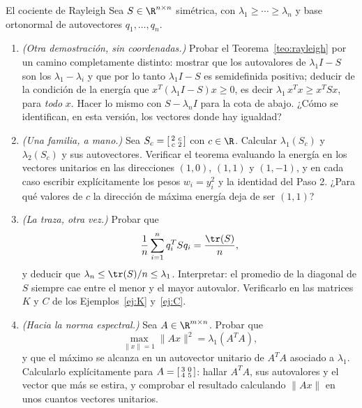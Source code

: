 \begin{entrega}{El cociente de Rayleigh}\label{ent:rayleigh}
Sea $S\in\R^{n\times n}$ simétrica, con $\lambda_1\ge\cdots\ge\lambda_n$ y
base ortonormal de autovectores $q_1,\dots,q_n$.

\begin{enumerate}[label=\textbf{(\alph*)},itemsep=3pt,topsep=4pt]
\item\label{item:rayleigh} \emph{(Otra demostración, sin coordenadas.)} Probar
el Teorema~\ref{teo:rayleigh} por un camino completamente distinto: mostrar
que los autovalores de $\lambda_1I-S$ son los $\lambda_1-\lambda_i$ y que por
lo tanto $\lambda_1I-S$ es semidefinida positiva; deducir de la condición de
la energía que $x^T(\lambda_1I-S)x\ge0$, es decir
$\lambda_1\,x^Tx\ge x^TSx$, para \emph{todo} $x$. Hacer lo mismo con
$S-\lambda_nI$ para la cota de abajo. ¿Cómo se identifican, en esta versión,
los vectores donde hay igualdad?

\item \emph{(Una familia, a mano.)} Sea
$S_c=\begin{bsmallmatrix} 2 & c\\ c & 2\end{bsmallmatrix}$ con $c\in\R$.
Calcular $\lambda_1(S_c)$ y $\lambda_2(S_c)$ y sus autovectores. Verificar el
teorema evaluando la energía en los vectores unitarios en las direcciones
$(1,0)$, $(1,1)$ y $(1,-1)$, y en cada caso escribir explícitamente los pesos
$w_i=y_i^2$ y la identidad del Paso 2. ¿Para qué valores de $c$ la dirección
de máxima energía deja de ser $(1,1)$?

\item \emph{(La traza, otra vez.)} Probar que
\[
\frac1n\sum_{i=1}^n q_i^TSq_i = \frac{\tr(S)}{n} ,
\]
y deducir que $\lambda_n\le \tr(S)/n\le\lambda_1$. Interpretar: el promedio de
la diagonal de $S$ siempre cae entre el menor y el mayor autovalor. Verificarlo
en las matrices $K$ y $C$ de los Ejemplos~\ref{ej:K} y~\ref{ej:C}.

\item \emph{(Hacia la norma espectral.)} Sea $A\in\R^{m\times n}$. Probar que
\[
\max_{\|x\|=1}\|Ax\|^2 = \lambda_1(A^TA) ,
\]
y que el máximo se alcanza en un autovector unitario de $A^TA$ asociado a
$\lambda_1$. Calcularlo explícitamente para
$A=\begin{bsmallmatrix} 3 & 0\\ 4 & 5\end{bsmallmatrix}$: hallar $A^TA$, sus
autovalores y el vector que más se estira, y comprobar el resultado
calculando $\|Ax\|$ en unos cuantos vectores unitarios.


\end{enumerate}
\end{entrega}
